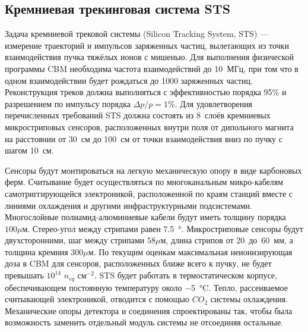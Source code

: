 \subsection{Кремниевая трекинговая система STS}\label{sec:secSTS}


Задача кремниевой трековой системы (Silicon Tracking System, STS) --- измерение траекторий и импульсов заряженных частиц, вылетающих из точки взаимодействия пучка тяжёлых ионов с мишенью. Для выполнения физической программы CBM необходима частота взаимодействий до 10~МГц, при том что в одном взаимодействии будет рождаться до 1000 заряженных частиц. Реконструкция треков должна выполняться с эффективностью порядка 95\% и разрешением по импульсу порядка $\Delta p / p = 1\%$. Для удовлетворения перечисленных требований STS должна состоять из 8~слоёв кремниевых микростриповых сенсоров, расположенных внутри поля от дипольного магнита на расстоянии от 30~см до 100~см от точки взаимодействия вниз по пучку с шагом 10~см.


Сенсоры будут монтироваться на легкую механическую опору в виде карбоновых ферм. Считывание будет осуществляться по многоканальным микро-кабелям самотриггирующейся электроникой, расположенной по краям станций вместе с линиями охлаждения и другими инфраструктурными подсистемами.
Многослойные полиамид-алюминиевые кабели будут иметь толщину порядка $100 \mu$м.
Стерео-угол между стрипами равен \SI{7.5}{\degree}.
Микростриповые сенсоры будут двухсторонними, шаг между стрипами $58 \mu$м, длина стрипов от 20~до~60~мм, а толщина кремния $300 \mu$м. По текущим оценкам максимальная неионизирующая доза в CBM для сенсоров, расположенных ближе всего к пучку, не будет превышать $10^{14}$ $n_{eq}$ см$^{-2}$. STS будет работать в термостатическом корпусе, обеспечивающем постоянную температуру около \SI{-5}{\degreeCelsius}. Тепло, рассеиваемое считывающей электроникой, отводится с помощью $CO_{2}$ системы охлаждения. Механические опоры детектора и соединения спроектированы так, чтобы была возможность заменить отдельный модуль системы не отсоединяя остальные.


